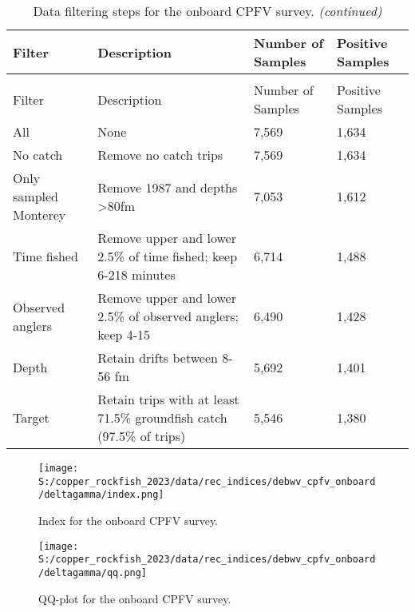 \documentclass[11pt,
  english,
  letterpaper,
]{article}
\begin{document}
\begin{landscape}\begingroup\fontsize{9}{11}\selectfont

\begin{longtable}[t]{l>{\raggedright\arraybackslash}p{8cm}ll}
\caption{\label{tab:deb-filter}Data filtering steps for the onboard CPFV survey.}\\
\toprule
Filter & Description & Number of Samples & Positive Samples\\
\midrule
\endfirsthead
\caption[]{\label{tab:deb-filter}Data filtering steps for the onboard CPFV survey. \textit{(continued)}}\\
\toprule
Filter & Description & Number of Samples & Positive Samples\\
\midrule
\endhead

\endfoot
\bottomrule
\endlastfoot
All & None & 7,569 & 1,634\\
No catch & Remove no catch trips & 7,569 & 1,634\\
Only sampled Monterey & Remove 1987 and depths >80fm & 7,053 & 1,612\\
Time fished & Remove upper and lower 2.5\% of time fished; keep 6-218 minutes & 6,714 & 1,488\\
Observed anglers & Remove upper and lower 2.5\% of observed anglers; keep 4-15 & 6,490 & 1,428\\
Depth & Retain drifts between 8-56 fm & 5,692 & 1,401\\
Target & Retain trips with at least 71.5\% groundfish catch (97.5\% of trips) & 5,546 & 1,380\\*
\end{longtable}
\endgroup{}
\end{landscape}
\endgroup{}

\newpage

\begin{figure}
\centering
\texttt{[image: S:/copper\_rockfish\_2023/data/rec\_indices/debwv\_cpfv\_onboard/deltagamma/index.png]}
\caption{Index for the onboard CPFV survey.\label{fig:deb-index}}
\end{figure}

\newpage

\begin{figure}
\centering
\texttt{[image: S:/copper\_rockfish\_2023/data/rec\_indices/debwv\_cpfv\_onboard/deltagamma/qq.png]}
\caption{QQ-plot for the onboard CPFV survey.\label{fig:deb-qq}}
\end{figure}
\end{document}
